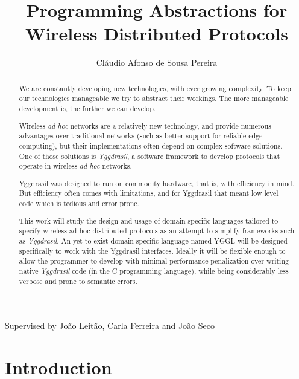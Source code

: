 \documentclass[runningheads]{../llncs}
\begin{document}
\title{Programming Abstractions for Wireless Distributed Protocols}
\author{Cláudio Afonso de Sousa Pereira}

\maketitle

\begin{center} Supervised by João Leitão, Carla Ferreira and João Seco \end{center}
\begin{abstract}
We are constantly developing new technologies, with ever growing complexity.
To keep our technologies manageable we try to abstract their workings. The more manageable development is, the further we can develop.
\par Wireless \textit{ad hoc} networks are a relatively new technology, and provide numerous advantages over traditional networks (such as better support for reliable edge computing), but their implementations often depend on complex software solutions. One of those solutions is \textit{Yggdrasil}, a software framework to develop protocols that operate in wireless \textit{ad hoc} networks.
\par Yggdrasil was designed to run on commodity hardware, that is, with efficiency in mind. But efficiency often comes with limitations, and for Yggdrasil that meant low level code which is tedious and error prone.
\par This work will study the design and usage of domain-specific languages tailored to specify wireless ad hoc distributed protocols as an attempt to simplify frameworks such as \textit{Yggdrasil}.
An yet to exist domain specific language named YGGL will be designed specifically to work with the Yggdrasil interfaces.
Ideally it will be flexible enough to allow the programmer to develop with minimal performance penalization over writing native \textit{Yggdrasil} code (in the C programming language), while being considerably less verbose and prone to semantic errors.
\end{abstract}

\section{Introduction}
\end{document}
